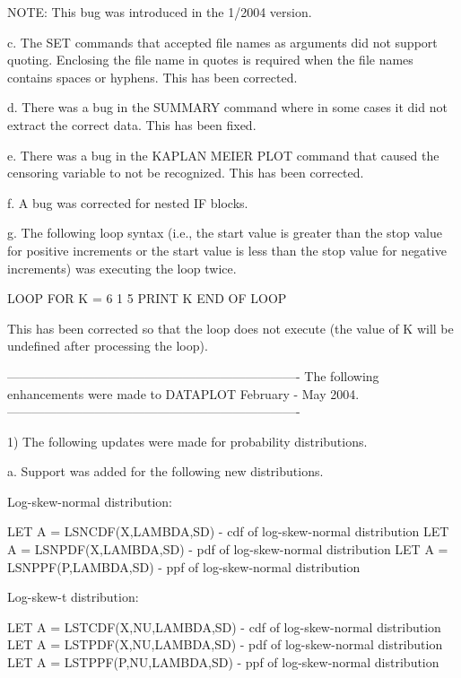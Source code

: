 {      NOTE: This bug was introduced in the 1/2004 version.

   c. The SET commands that accepted file names as arguments did
      not support quoting.  Enclosing the file name in quotes is
      required when the file names contains spaces or hyphens.
      This has been corrected.

   d. There was a bug in the SUMMARY command where in some cases
      it did not extract the correct data.  This has been fixed.

   e. There was a bug in the KAPLAN MEIER PLOT command that caused
      the censoring variable to not be recognized.  This has been
      corrected.

   f. A bug was corrected for nested IF blocks.

   g. The following loop syntax (i.e., the start value is greater than
      the stop value for positive increments or the start value is
      less than the stop value for negative increments) was executing
      the loop twice.

         LOOP FOR K = 6  1  5
             PRINT K
         END OF LOOP

      This has been corrected so that the loop does not execute
      (the value of K will be undefined after processing the loop).

----------------------------------------------------------------------
The following enhancements were made to DATAPLOT February - May  2004.
----------------------------------------------------------------------

 1) The following updates were made for probability distributions.

    a. Support was added for the following new distributions.

       Log-skew-normal distribution:

       LET A = LSNCDF(X,LAMBDA,SD) - cdf of log-skew-normal
                                     distribution
       LET A = LSNPDF(X,LAMBDA,SD) - pdf of log-skew-normal
                                     distribution
       LET A = LSNPPF(P,LAMBDA,SD) - ppf of log-skew-normal
                                     distribution

       Log-skew-t distribution:

       LET A = LSTCDF(X,NU,LAMBDA,SD) - cdf of log-skew-normal
                                        distribution
       LET A = LSTPDF(X,NU,LAMBDA,SD) - pdf of log-skew-normal
                                        distribution
       LET A = LSTPPF(P,NU,LAMBDA,SD) - ppf of log-skew-normal
                                        distribution

}
